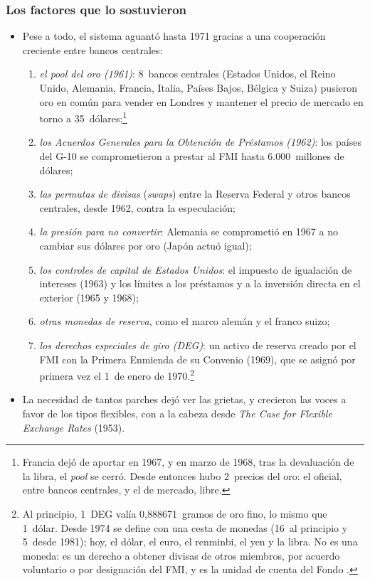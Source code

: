 \documentclass[11pt]{article}
\begin{document}
\subsubsection{Los factores que lo sostuvieron}

\begin{itemize}
\item Pese a todo, el sistema aguantó hasta 1971 gracias a una cooperación creciente entre bancos centrales:
  \begin{enumerate}
  \item \emph{el \emph{pool} del oro (1961)}: 8~bancos centrales (Estados Unidos, el Reino Unido, Alemania, Francia, Italia, Países Bajos, Bélgica y Suiza) pusieron oro en común para vender en Londres y mantener el precio de mercado en torno a 35~dólares;\footnote{Francia dejó de aportar en 1967, y en marzo de 1968, tras la devaluación de la libra, el \emph{pool} se cerró\nocite{BordoMonnetNaef2019}. Desde entonces hubo 2~precios del oro: el oficial, entre bancos centrales, y el de mercado, libre.}
  \item \emph{los Acuerdos Generales para la Obtención de Préstamos (1962)}: los países del G-10 se comprometieron a prestar al FMI hasta 6.000~millones de dólares\nocite{FMI2026GAB};
  \item \emph{las permutas de divisas} (\emph{swaps}) entre la Reserva Federal y otros bancos centrales, desde 1962, contra la especulación;
  \item \emph{la presión para no convertir}: Alemania se comprometió en 1967 a no cambiar sus dólares por oro (Japón actuó igual);
  \item \emph{los controles de capital de Estados Unidos}: el impuesto de igualación de intereses (1963) y los límites a los préstamos y a la inversión directa en el exterior (1965 y 1968);
  \item \emph{otras monedas de reserva}, como el marco alemán y el franco suizo;
  \item \emph{los derechos especiales de giro (DEG)}: un activo de reserva creado por el FMI con la Primera Enmienda de su Convenio (1969), que se asignó por primera vez el 1~de enero de 1970.\footnote{Al principio, 1~DEG valía 0,888671~gramos de oro fino, lo mismo que 1~dólar. Desde 1974 se define con una cesta de monedas (16~al principio y 5~desde 1981); hoy, el dólar, el euro, el renminbi, el yen y la libra\nocite{FMI2026DEG}. No es una moneda: es un derecho a obtener divisas de otros miembros, por acuerdo voluntario o por designación del FMI, y es la unidad de cuenta del Fondo .}
  \end{enumerate}
\item La necesidad de tantos parches dejó ver las grietas, y crecieron las voces a favor de los tipos flexibles, con  a la cabeza desde \emph{The Case for Flexible Exchange Rates} (1953)\nocite{Friedman1953Case}.
\end{itemize}
\end{document}
